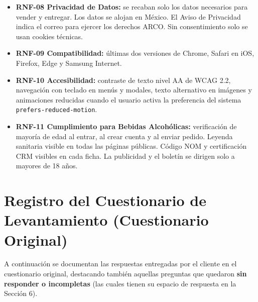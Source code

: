 \documentclass[11pt,letterpaper]{article}
\begin{document}
\begin{itemize}[leftmargin=1.5em]
    \item \textbf{RNF-08 Privacidad de Datos:} se recaban solo los datos necesarios para vender y entregar. Los datos se alojan en México. El Aviso de Privacidad indica el correo para ejercer los derechos ARCO. Sin consentimiento solo se usan cookies técnicas.
    \item \textbf{RNF-09 Compatibilidad:} últimas dos versiones de Chrome, Safari en iOS, Firefox, Edge y Samsung Internet.
    \item \textbf{RNF-10 Accesibilidad:} contraste de texto nivel AA de WCAG 2.2, navegación con teclado en menús y modales, texto alternativo en imágenes y animaciones reducidas cuando el usuario activa la preferencia del sistema \texttt{prefers-reduced-motion}.
    \item \textbf{RNF-11 Cumplimiento para Bebidas Alcohólicas:} verificación de mayoría de edad al entrar, al crear cuenta y al enviar pedido. Leyenda sanitaria visible en todas las páginas públicas. Código NOM y certificación CRM visibles en cada ficha. La publicidad y el boletín se dirigen solo a mayores de 18 años.
\end{itemize}

\newpage

\section{Registro del Cuestionario de Levantamiento (Cuestionario Original)}

A continuación se documentan las respuestas entregadas por el cliente en el cuestionario original, destacando también aquellas preguntas que quedaron \textbf{sin responder o incompletas} (las cuales tienen su espacio de respuesta en la Sección 6).
\end{document}
